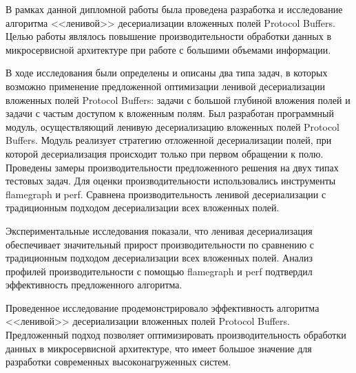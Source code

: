 
В рамках данной дипломной работы была проведена разработка и исследование алгоритма <<ленивой>> десериализации 
вложенных полей Protocol Buffers. Целью работы являлось повышение производительности обработки данных 
в микросервисной архитектуре при работе с большими объемами информации.

В ходе исследования были определены и описаны два типа задач, в которых возможно применение предложенной оптимизации ленивой десериализации вложенных полей Protocol Buffers: задачи с большой глубиной вложения полей и задачи с частым доступом к вложенным полям.
Был разработан программный модуль, осуществляющий ленивую десериализацию вложенных полей Protocol Buffers. Модуль реализует стратегию отложенной десериализации полей, при которой десериализация происходит только при первом обращении к полю.
Проведены замеры производительности предложенного решения на двух типах тестовых задач. Для оценки производительности использовались инструменты flamegraph и perf.
Сравнена производительность ленивой десериализации с традиционным подходом десериализации всех вложенных полей.

Экспериментальные исследования показали, что ленивая десериализация обеспечивает значительный прирост производительности по сравнению с традиционным подходом десериализации всех вложенных полей.
Анализ профилей производительности с помощью flamegraph и perf подтвердил эффективность предложенного алгоритма.

Проведенное исследование продемонстрировало эффективность алгоритма <<ленивой>> десериализации вложенных полей Protocol Buffers. Предложенный подход позволяет оптимизировать производительность обработки данных в микросервисной архитектуре, что имеет большое значение для разработки современных высоконагруженных систем.
